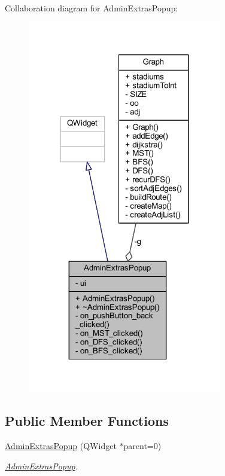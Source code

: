 Collaboration diagram for Admin\+Extras\+Popup\+:
\nopagebreak
\begin{figure}[H]
\begin{center}
\leavevmode
\includegraphics[width=240pt]{class_admin_extras_popup__coll__graph}
\end{center}
\end{figure}
\subsection*{Public Member Functions}
\begin{DoxyCompactItemize}
\item 
\hyperlink{class_admin_extras_popup_aabaeaaf01620c0152932fe79a4753964}{Admin\+Extras\+Popup} (Q\+Widget $\ast$parent=0)
\begin{DoxyCompactList}\small\item\em \hyperlink{class_admin_extras_popup}{Admin\+Extras\+Popup}. \end{DoxyCompactList}\end{DoxyCompactItemize}
